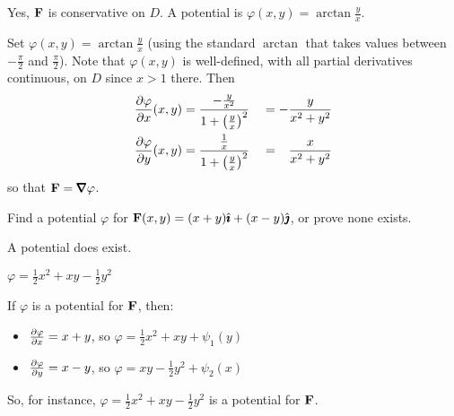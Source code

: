 \begin{answer} 
Yes, $\mathbf{F}$ is conservative on $D$. A potential is 
$\varphi(x,y) = \arctan\frac{y}{x}$.
\end{answer}

\begin{solution}
Set $\varphi(x,y)= \arctan\frac{y}{x}$ (using the standard $\arctan$
that takes values between $-\frac{\pi}{2}$ and $\frac{\pi}{2}$). 
Note that $\varphi(x,y)$ is well-defined, with all partial derivatives 
continuous, on $D$ since $x>1$ there. Then
\begin{alignat*}{3}
\pdiff{\varphi}{x}(x,y) 
&= \frac{-\frac{y}{x^2}}{1+\big(\frac{y}{x}\big)^2}
&&= -\frac{y}{x^2+y^2} \\
\pdiff{\varphi}{y}(x,y)  
&= \frac{\frac{1}{x}}{1+\big(\frac{y}{x}\big)^2}
&&= \phantom{-} \frac{x}{x^2+y^2}
\end{alignat*}
so that $\vF=\vnabla\varphi$.
\end{solution}



\begin{question}
Find a potential $\varphi$ for $\mathbf{F}(x,y)=(x+y)\hat{\pmb{\imath}}+(x-y)\hat{\pmb{\jmath}}$, or prove none exists.
\end{question}
\begin{hint}
A potential does exist.
\end{hint}
\begin{answer}
$\varphi=\frac{1}{2}x^2+xy-\frac{1}{2}y^2$
\end{answer}
\begin{solution}
If $\varphi$ is a potential for $\mathbf{F}$, then:
\begin{itemize}
\item $\pdiff{\varphi}{x}=x+y$, so $\varphi = \frac{1}{2}x^2+xy+\psi_1(y)$
\item $\pdiff{\varphi}{y}=x-y$, so $\varphi = xy-\frac{1}{2}y^2+\psi_2(x)$
\end{itemize}
So, for instance, $\varphi = \frac{1}{2}x^2+xy-\frac{1}{2}y^2$ is a potential for $\mathbf{F}$.
\end{solution}


